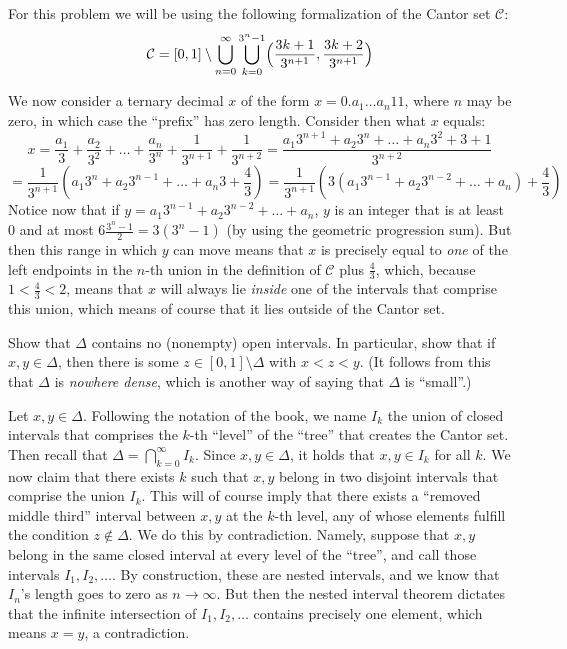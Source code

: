 \begin{solution}

    For this problem we will be using the following formalization of the Cantor set $\mathcal{C}$:
    $$\mathcal{C} = [0, 1] \setminus \bigcup_{n=0}^{\infty} \bigcup_{k=0}^{3^n - 1} \Bigl ( \frac{3k + 1}{3^{n+1}}, \frac{3k + 2}{3^{n+1}} \Bigr )$$

    We now consider a ternary decimal $x$ of the form $x = 0.a_1 \ldots a_n 1 1$, where $n$ may be zero, in which case the ``prefix'' has zero length. 
    Consider then what $x$ equals:
    $$x = \frac{a_1}{3} + \frac{a_2}{3^2} + \ldots +\frac{a_n}{3^n} + \frac{1}{3^{n+1}} + \frac{1}{3^{n+2}} = \frac{a_1 3^{n+1} + a_2 3^n + \ldots + a_n3^2 + 3 + 1}{3^{n+2}}$$
    $$= \frac{1}{3^{n+1}}(a_1 3^n + a_2 3^{n-1} + \ldots + a_n 3 + \frac{4}{3}) = \frac{1}{3^{n+1}}(3(a_1 3^{n-1} + a_2 3^{n-2} + \ldots + a_n) + \frac{4}{3})$$
    Notice now that if $y = a_1 3^{n-1} + a_2 3^{n-2} + \ldots + a_n$, $y$ is an integer that is at least 0 and at most $6\frac{3^n - 1}{2} = 3(3^n - 1)$ (by using the geometric progression sum).
    But then this range in which $y$ can move means that $x$ is precisely equal to \textit{one} of the left endpoints in the $n$-th union in the definition of $\mathcal{{C}}$ plus $\frac{4}{3}$, which, because $1 < \frac{4}{3} < 2$, means that $x$ will always lie \textit{inside} one of the intervals that comprise this union, which means of course that it lies outside of the Cantor set.
\end{solution}

\begin{exercise}{22}
    Show that $\Delta$ contains no (nonempty) open intervals.
    In particular, show that if $x, y \in \Delta$, then there is some $z \in [0, 1] \setminus \Delta$ with $x < z < y$. 
    (It follows from this that $\Delta$ is \textit{nowhere dense}, which is another way of saying that $\Delta$ is ``small''.)
\end{exercise}

\begin{solution}

    Let $x, y \in \Delta$.
    Following the notation of the book, we name $I_k$ the union of closed intervals that comprises the $k$-th ``level'' of the ``tree'' that creates the Cantor set.
    Then recall that $\Delta = \bigcap_{k=0}^{\infty} I_k$.
    Since $x, y \in \Delta$, it holds that $x, y \in I_k$ for all $k$.
    We now claim that there exists $k$ such that $x, y$ belong in two disjoint intervals that comprise the union $I_k$.
    This will of course imply that there exists a ``removed middle third'' interval between $x, y$ at the $k$-th level, any of whose elements fulfill the condition $z \notin \Delta$.
    We do this by contradiction. 
    Namely, suppose that $x, y$ belong in the same closed interval at every level of the ``tree'', and call those intervals $I_1, I_2, \ldots$.
    By construction, these are nested intervals, and we know that $I_n$'s length goes to zero as $n \rightarrow \infty$.
    But then the nested interval theorem dictates that the infinite intersection of $I_1, I_2, \ldots$ contains precisely one element, which means $x = y$, a contradiction.
\end{solution}

